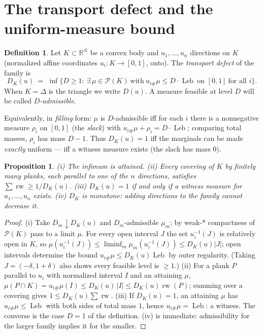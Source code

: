 \documentclass[11pt,reqno]{amsart}
\theoremstyle{plain}
\newtheorem{proposition}[theorem]{Proposition}
\theoremstyle{definition}
\newtheorem{definition}[theorem]{Definition}
\theoremstyle{remark}
\newcommand{\rw}{\operatorname{rw}}
\newcommand{\Leb}{\operatorname{Leb}}
\newcommand{\R}{\mathbb{R}}
\begin{document}
\section{The transport defect and the uniform-measure bound}\label{sec:measure}

\begin{definition}\label{def:defect}
Let $K\subset\R^N$ be a convex body and $u_1,\dots,u_n$ directions on $K$
(normalized affine coordinates $u_i:K\to[0,1]$, onto). The \emph{transport
defect} of the family is
\[
D_K(u)\;=\;\inf\bigl\{D\ge1:\ \exists\,\mu\in\mathcal P(K)\ \text{with}\
u_{i\#}\mu\le D\cdot\Leb\ \text{on }[0,1]\ \text{for all }i\bigr\}.
\]
When $K=\Delta$ is the triangle we write $D(u)$. A measure feasible at level
$D$ will be called \emph{$D$-admissible}.
\end{definition}

Equivalently, in \emph{filling} form: $\mu$ is $D$-admissible iff for each $i$
there is a nonnegative measure $\rho_i$ on $[0,1]$ (the \emph{slack}) with
$u_{i\#}\mu+\rho_i=D\cdot\Leb$; comparing total masses, $\rho_i$ has mass
$D-1$. Thus $D_K(u)=1$ iff the marginals can be made \emph{exactly} uniform ---
iff a witness measure exists (the slack has mass $0$).

\begin{proposition}\label{prop:defect}
(i) The infimum is attained. (ii) Every covering of $K$ by finitely many
planks, each parallel to one of the $n$ directions, satisfies
$\sum\rw\ge 1/D_K(u)$. (iii) $D_K(u)=1$ if and only if a witness measure for
$u_1,\dots,u_n$ exists. (iv) $D_K$ is monotone: adding directions to the
family cannot decrease it.
\end{proposition}

\begin{proof}
(i) Take $D_m\downarrow D_K(u)$ and $D_m$-admissible $\mu_m$; by weak-$*$
compactness of $\mathcal P(K)$ pass to a limit $\mu$. For every open interval
$J$ the set $u_i^{-1}(J)$ is relatively open in $K$, so
$\mu(u_i^{-1}(J))\le\liminf_m\mu_m(u_i^{-1}(J))\le D_K(u)|J|$; open intervals
determine the bound $u_{i\#}\mu\le D_K(u)\Leb$ by outer regularity. (Taking
$J=(-\delta,1+\delta)$ also shows every feasible level is $\ge1$.)
(ii) For a plank $P$ parallel to $u_i$ with normalized interval $I$ and an
attaining $\mu$,
$\mu(P\cap K)=u_{i\#}\mu(I)\le D_K(u)\,|I|\le D_K(u)\rw(P)$; summing over a
covering gives $1\le D_K(u)\sum\rw$.
(iii) If $D_K(u)=1$, an attaining $\mu$ has $u_{i\#}\mu\le\Leb$ with both sides
of total mass $1$, hence $u_{i\#}\mu=\Leb$: a witness. The converse is the case
$D=1$ of the definition. (iv) is immediate: admissibility for the larger family
implies it for the smaller.
\end{proof}
\end{document}
